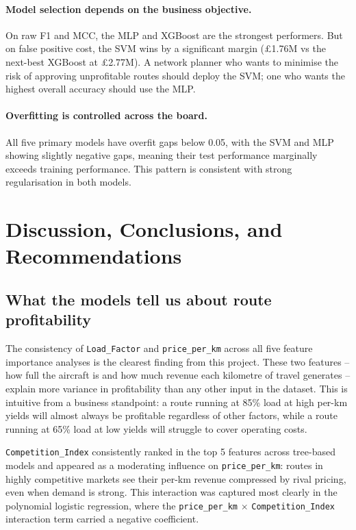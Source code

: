 \documentclass[12pt,a4paper]{article}
\begin{document}
\paragraph{Model selection depends on the business objective.} On raw F1 and MCC, the MLP and XGBoost are the strongest performers. But on false positive cost, the SVM wins by a significant margin (£1.76M vs the next-best XGBoost at £2.77M). A network planner who wants to minimise the risk of approving unprofitable routes should deploy the SVM; one who wants the highest overall accuracy should use the MLP.

\paragraph{Overfitting is controlled across the board.} All five primary models have overfit gaps below 0.05, with the SVM and MLP showing slightly negative gaps, meaning their test performance marginally exceeds training performance. This pattern is consistent with strong regularisation in both models.

\section{Discussion, Conclusions, and Recommendations}
\label{sec:discussion}

\subsection{What the models tell us about route profitability}
\label{subsec:insights}

The consistency of \texttt{Load\_Factor} and \texttt{price\_per\_km} across all five feature importance analyses is the clearest finding from this project. These two features -- how full the aircraft is and how much revenue each kilometre of travel generates -- explain more variance in profitability than any other input in the dataset. This is intuitive from a business standpoint: a route running at 85\% load at high per-km yields will almost always be profitable regardless of other factors, while a route running at 65\% load at low yields will struggle to cover operating costs.

\texttt{Competition\_Index} consistently ranked in the top 5 features across tree-based models and appeared as a moderating influence on \texttt{price\_per\_km}: routes in highly competitive markets see their per-km revenue compressed by rival pricing, even when demand is strong. This interaction was captured most clearly in the polynomial logistic regression, where the \texttt{price\_per\_km} $\times$ \texttt{Competition\_Index} interaction term carried a negative coefficient.
\end{document}
